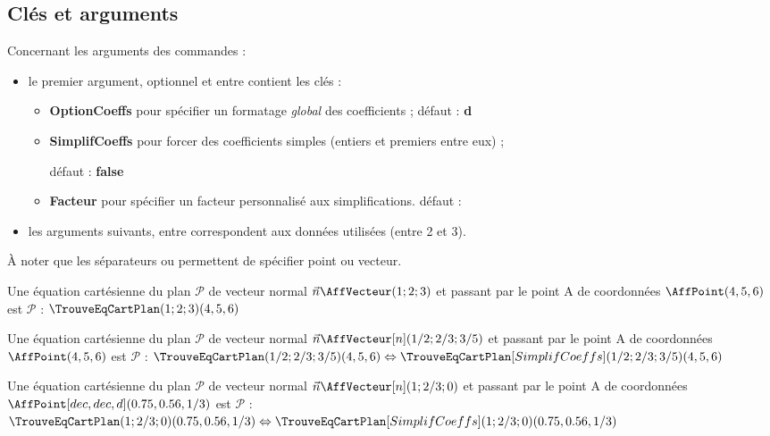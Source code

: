 \documentclass[a4paper,french,11pt]{article}
\newcommand\ctex[1]{\tcbox[vignettelatex]{#1}}
\newcommand\Cle[1]{{\bfseries\sffamily\textlangle #1\textrangle}}
\begin{document}
\subsection{Clés et arguments}

\begin{cautionblock}
Concernant les arguments des commandes :

\begin{itemize}
	\item le premier argument, optionnel et entre \ctex{[...]}  contient les clés :
	\begin{itemize}
		\item \Cle{OptionCoeffs} pour spécifier un formatage \textit{global} des coefficients ; \hfill{}défaut : \Cle{d}
		\item \Cle{SimplifCoeffs} pour forcer des coefficients simples (entiers et premiers entre eux) ;
		
		\hfill{}défaut : \Cle{false}
		\item \Cle{Facteur} pour spécifier un facteur personnalisé aux simplifications. \hfill{}défaut : \Cle{1}
	\end{itemize}
	\item les arguments suivants, entre \ctex{(...)} correspondent aux données utilisées (entre 2 et 3).
\end{itemize}

À noter que les séparateurs \ctex{,} ou \ctex{;} permettent de spécifier point ou vecteur.
\end{cautionblock}

\begin{PresCodePL}{}
Une équation cartésienne du plan $\mathcal{P}$ de vecteur normal $\vec{n} \AffVecteur(1;2;3)$ et passant par le point A de coordonnées $\AffPoint(4,5,6)$ est $\mathcal{P}$ : $\TrouveEqCartPlan(1;2;3)(4,5,6)$
\end{PresCodePL}

\begin{PresCodePL}{}
Une équation cartésienne du plan $\mathcal{P}$ de vecteur normal $\vec{n} \AffVecteur[n](1/2;2/3;3/5)$ et passant par le point A de coordonnées $\AffPoint(4,5,6)$ est $\mathcal{P}$ : $\TrouveEqCartPlan(1/2;2/3;3/5)(4,5,6) \Leftrightarrow \TrouveEqCartPlan[SimplifCoeffs](1/2;2/3;3/5)(4,5,6)$
\end{PresCodePL}

\begin{PresCodePL}{}
Une équation cartésienne du plan $\mathcal{P}$ de vecteur normal $\vec{n} \AffVecteur[n](1;2/3;0)$ et passant par le point A de coordonnées $\AffPoint[dec,dec,d](0.75,0.56,1/3)$ est $\mathcal{P}$ :  $\TrouveEqCartPlan(1;2/3;0)(0.75,0.56,1/3) \Leftrightarrow  \TrouveEqCartPlan[SimplifCoeffs](1;2/3;0)(0.75,0.56,1/3)$
\end{PresCodePL}
\end{document}
